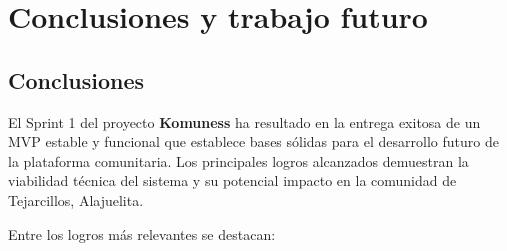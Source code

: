 \chapter{Conclusiones y trabajo futuro}

\section{Conclusiones}
El Sprint 1 del proyecto \textbf{Komuness} ha resultado en la entrega exitosa de un MVP estable y funcional que establece bases sólidas para el desarrollo futuro de la plataforma comunitaria. Los principales logros alcanzados demuestran la viabilidad técnica del sistema y su potencial impacto en la comunidad de Tejarcillos, Alajuelita.

Entre los logros más relevantes se destacan:

